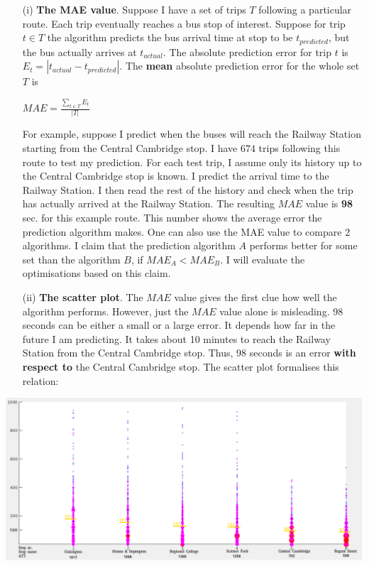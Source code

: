 \documentclass[12pt,a4paper,oneside,openright]{report}
\begin{document}
\begin{enumerate}
\item[(i)]
    \textbf{The MAE value}. Suppose I have a set
    of trips $T$ following a particular route. Each trip eventually reaches a bus stop of interest. 
    Suppose for trip $t \in T$ the algorithm predicts the bus arrival time
    at stop to be $t_{predicted}$, but the bus actually arrives at $t_{actual}$.
    The absolute prediction error for trip $t$ is
    $E_t = |t_{actual} - t_{predicted}|$. The \textbf{mean} absolute prediction
    error for the whole set $T$ is

    \begin{center}
        $MAE = \frac{\sum\nolimits_{t \in {T}}{E_t}}{|T|}$
    \end{center}

    For example, suppose I predict when the buses will reach the Railway Station
    starting from the Central Cambridge stop. I have $674$ trips
    following this route to test my prediction. For each test trip, I assume
    only its history up to the Central Cambridge stop is known. I predict
    the arrival time to the Railway Station. I then read the rest of the history and
    check when the trip has actually arrived at the Railway Station.
    The resulting $MAE$ value is \textbf{98} sec. for this example route. This number shows
    the average error the prediction algorithm makes. One can also use the MAE value to compare
    2 algorithms. I claim that the prediction algorithm $A$ performs better
    for some set than the algorithm $B$, if $MAE_A < MAE_B$. I will evaluate the optimisations based
    on this claim.

\item[(ii)] \textbf{The scatter plot}. The $MAE$ value gives the first
   clue how well the algorithm performs. However, just the $MAE$ value
   alone is misleading. 98 seconds can be either a small or a large
   error. It depends how far in the future I am predicting. It takes about 10 
   minutes to reach the Railway Station from the Central Cambridge stop. Thus,
   98 seconds is an error \textbf{with respect to} the Central Cambridge stop. 
   The scatter plot formalises this relation:


\end{enumerate}

\includegraphics[width=\textwidth]{figs/scatter_plot.png} \\
\end{document}

